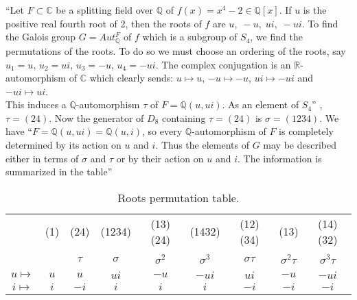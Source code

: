 ``Let \(F \subset \mathbb{C}\) be a splitting field over \(\mathbb{Q}\) of \(f(x)=x^4-2 \in \mathbb{Q}[x]\). If \(u\) is the positive real fourth root of 2, then the roots of \(f\) are \(u,\; -u,\; ui,\; -ui\). To find the  Galois group \(G = Aut_{\mathbb{Q}}^F\) of \(f\) which is a subgroup of \(S_4\), we find the permutations of the roots. To do so  we must choose an ordering of the roots, say \(u_1=u\), \(u_2=ui\), \(u_3=-u\), \(u_4= -ui\). The complex conjugation is an \(\mathbb{R}\)-automorphism of \(\mathbb{C}\) which clearly sends:
\(u \mapsto u\), \(-u \mapsto -u\), \(ui \mapsto -ui\) and \(-ui \mapsto ui\). \\
This induces a \(\mathbb{Q}\)-automorphism \(\tau\) of \(F=\mathbb{Q}(u,ui)\). As an element of \(S_4\)'' \cite{hunger}, \(\tau=(24)\).
Now the generator of \(D_8\) containing \(\tau = (24)\) is \(\sigma = (1234)\). We have ``\(F=\mathbb{Q}(u,ui)=\mathbb{Q}(u,i)\),
so every \(\mathbb{Q}\)-automorphism of \(F\) is completely determined by its action on \(u\) and \(i\). Thus the elements of \(G\)
may be described either in terms of \(\sigma\) and \(\tau\) or by their action on \(u\) and \(i\). The information is summarized in the table'' \cite{hunger}
\vspace{2mm}

\begin{table}[h!]
\begin{tabular}{|c|c|c|c|c|c|c|c|c|}
  \hline
  \ & (1) & (24) & (1234) & (13)(24) & (1432) & (12)(34) & (13) & (14)(32) \\
  \ &  & \(\tau\)  & \(\sigma\) & \({\sigma}^2\) & \({\sigma}^3\) & \(\sigma \tau\) & \({\sigma}^2 \tau\) & \({\sigma}^3 \tau\) \\
  \hline
  \(u \mapsto\) & \(u\) & \(u\) & \(ui\) & \(-u\) & \(-ui\) & \(ui\) & \(-u\) & \(-ui\) \\
  \(i \mapsto\) & \(i\) & \(-i\) & \(i\) & \(i\) & \(i\) & \(-i\) & \(-i\) & \(-i\) \\
  \hline
\end{tabular}
\caption{\small Roots permutation table.}
\end{table}

